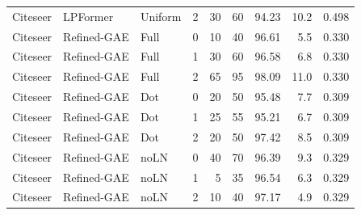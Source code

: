 {\begin{longtable}{lllrrrrrr}
Citeseer & LPFormer & Uniform & 2 & 30 & 60 & 94.23 & 10.2 & 0.498 \\
Citeseer & Refined-GAE & Full & 0 & 10 & 40 & 96.61 & 5.5 & 0.330 \\
Citeseer & Refined-GAE & Full & 1 & 30 & 60 & 96.58 & 6.8 & 0.330 \\
Citeseer & Refined-GAE & Full & 2 & 65 & 95 & 98.09 & 11.0 & 0.330 \\
Citeseer & Refined-GAE & Dot & 0 & 20 & 50 & 95.48 & 7.7 & 0.309 \\
Citeseer & Refined-GAE & Dot & 1 & 25 & 55 & 95.21 & 6.7 & 0.309 \\
Citeseer & Refined-GAE & Dot & 2 & 20 & 50 & 97.42 & 8.5 & 0.309 \\
Citeseer & Refined-GAE & noLN & 0 & 40 & 70 & 96.39 & 9.3 & 0.329 \\
Citeseer & Refined-GAE & noLN & 1 & 5 & 35 & 96.54 & 6.3 & 0.329 \\
Citeseer & Refined-GAE & noLN & 2 & 10 & 40 & 97.17 & 4.9 & 0.329 \\
\end{longtable}
}
